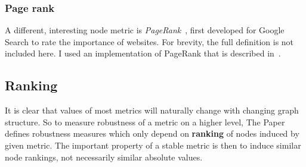 \subsubsection*{Page rank}

A different, interesting node metric is \textsl{PageRank}~\cite{BrinAnatomyLargescaleHypertextual1998}, first developed for Google Search to rate the importance of websites.
For brevity, the full definition is not included here.
I used an implementation of PageRank that is described in~\cite{ilprints422}.


\subsection{Ranking}\label{sec:ranking}

It is clear that values of most metrics will naturally change with changing graph structure.
So to measure robustness of a metric on a higher level, The Paper defines robustness measures which only depend on \textbf{ranking} of nodes induced by given metric.
The important property of a stable metric is then to induce similar node rankings, not necessarily similar absolute values.

